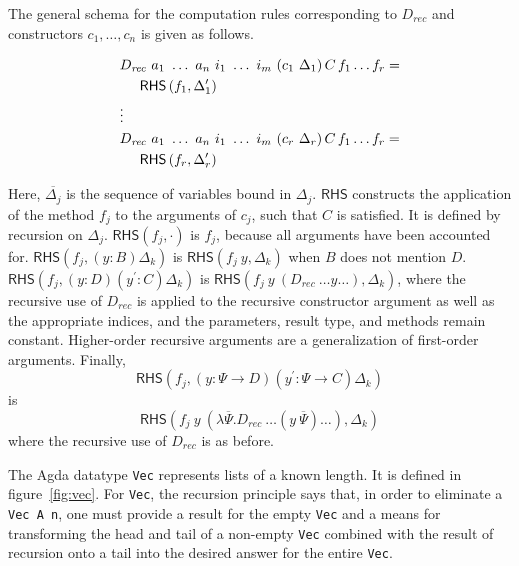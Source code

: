 \documentclass[sigplan,10pt]{acmart}
\begin{document}
The general schema for the computation rules corresponding to $D_{\mathit{rec}}$ and constructors $c_1, \ldots, c_n$ is given as follows.

\newcommand*{\RHSap}[2]{\ensuremath{\mathsf{RHS}\left(#1, #2\right)}}
\newcommand*{\RHS}[1]{\RHSap{f_{#1}}{\Delta_{#1}^\prime}}


\begin{center}
\begingroup
\fontsize{8.9pt}{2pt}\selectfont
\begin{align*}
& D_\mathit{rec}\ a_1\ \ldots\ a_n\ i_1\ \ldots\ i_m\ (c_1\ {\Delta_1}) \, C \, f_1 \ldots f_r = \\
&\hspace{0.5cm}\RHS{1}\\
& \vdots  \\
& D_\mathit{rec}\ a_1\ \ldots\ a_n\ i_1\ \ldots\ i_m\ (c_r\ {\Delta_r}) \, C \, f_1 \ldots f_r = \\
&\hspace{0.5cm}\RHS{r}\\ 
\end{align*}
\endgroup
\end{center}
\normalsize

Here, $\overline{\Delta_j}$ is the sequence of variables bound in $\Delta_j$.
$\mathsf{RHS}$ constructs the application of the method $f_j$ to the arguments of $c_j$, such that $C$ is satisfied.
It is defined by recursion on $\Delta_j$.
$\RHSap{f_j}{\cdot}$ is $f_j$, because all arguments have been accounted for.
$\RHSap{f_j}{(y : B)\Delta_k}$ is $\RHSap{f_j\ y}{\Delta_k}$ when $B$ does not mention $D$.
$\RHSap{f_j}{(y : D) (y^\prime : C)\Delta_k}$ is $\RHSap{f_j\ y\ \left(D_{\mathit{rec}}\ \ldots y \ldots\right)}{\Delta_k}$, where the recursive use of $D_{\mathit{rec}}$ is applied to the recursive constructor argument as well as the appropriate indices, and the parameters, result type, and methods remain constant.
Higher-order recursive arguments are a generalization of first-order arguments.
Finally,
\begin{displaymath}
\RHSap{f_j}{(y : \Psi \to D) (y^\prime : \Psi \to C)\Delta_k}
\end{displaymath}
is
\begin{displaymath}
\RHSap{f_j\ y\ \left(\lambda \overline{\Psi} . D_{\mathit{rec}}\ \ldots \left(y\ \overline{\Psi} \right) \ldots\right)}{\Delta_k}
\end{displaymath}
where the recursive use of $D_{\mathit{rec}}$ is as before.

The Agda datatype \texttt{Vec} represents lists of a known length. It is defined in figure~\ref{fig:vec}. For {\tt Vec}, the recursion principle says that, in order to eliminate a \texttt{Vec A n}, one must provide a result for the empty \texttt{Vec} and a means for transforming the head and tail of a non-empty \texttt{Vec} combined with the result of recursion onto a tail into the desired answer for the entire \texttt{Vec}.
\end{document}
